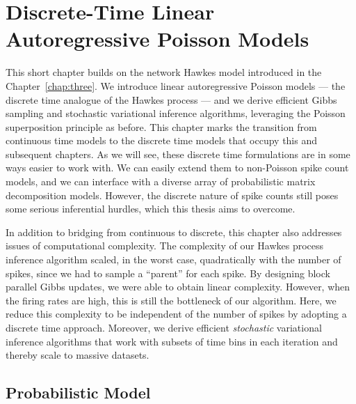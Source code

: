 \chapter{Discrete-Time Linear Autoregressive Poisson Models}
\label{chap:four}

This short chapter builds on the network Hawkes model introduced in
the Chapter~\ref{chap:three}. We introduce linear autoregressive
Poisson models --- the discrete time analogue of the Hawkes process
--- and we derive efficient Gibbs sampling and stochastic variational
inference algorithms, leveraging the Poisson superposition principle as
before. This chapter marks the transition from continuous time models to
the discrete time models that occupy this and subsequent chapters. As
we will see, these discrete time formulations are in some ways easier
to work with. We can easily extend them to non-Poisson spike count
models, and we can interface with a diverse array of probabilistic
matrix decomposition models. However, the discrete nature of spike
counts still poses some serious inferential hurdles, which this thesis
aims to overcome.

In addition to bridging from continuous to discrete, this chapter also
addresses issues of computational complexity. The complexity of our
Hawkes process inference algorithm scaled, in the worst case,
quadratically with the number of spikes, since we had to sample a
``parent'' for each spike.  By designing block parallel Gibbs updates,
we were able to obtain linear complexity. However, when the firing
rates are high, this is still the bottleneck of our algorithm. Here,
we reduce this complexity to be independent of the number of spikes by
adopting a discrete time approach.  Moreover, we derive efficient
\emph{stochastic} variational inference algorithms
\citep{Hoffman-2013} that work with subsets of time bins in each
iteration and thereby scale to massive datasets.


\section{Probabilistic Model}

